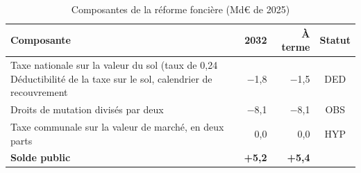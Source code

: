 \begin{table}[!htbp]\small\setlength{\tabcolsep}{4pt}
\caption{Composantes de la réforme foncière (Md€ de 2025)}\label{tab:t3}
\begin{tabularx}{\linewidth}{@{}Xrrc@{}}
\toprule
\textbf{Composante} & \textbf{2032} & \textbf{À terme} & \textbf{Statut} \\
\midrule
Taxe nationale sur la valeur du sol (taux de 0,24 %
Déductibilité de la taxe sur le sol, calendrier de recouvrement & $-$1,8 & $-$1,5 & DED \\
Droits de mutation divisés par deux & $-$8,1 & $-$8,1 & OBS \\
Taxe communale sur la valeur de marché, en deux parts & 0,0 & 0,0 & HYP \\
\midrule \textbf{Solde public} & \textbf{+5,2} & \textbf{+5,4} & \\
\bottomrule
\end{tabularx}
\par{}
\end{table}
